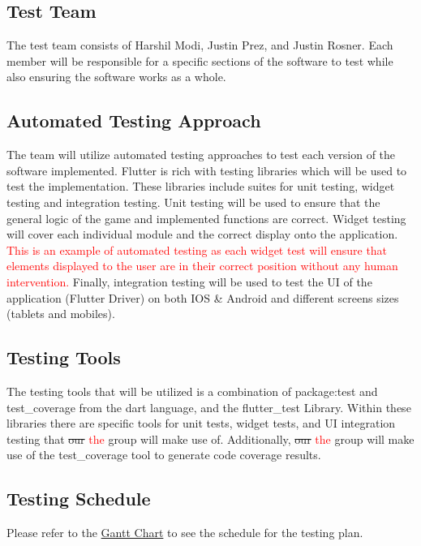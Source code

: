 \documentclass[12pt, titlepage]{article}
\begin{document}
\subsection{Test Team}
The test team consists of Harshil Modi, Justin Prez, and Justin Rosner. Each member will be responsible for a specific sections of the software to test while also ensuring the software works as a whole.

\subsection{Automated Testing Approach}
The team will utilize automated testing approaches to test each version of the software implemented. Flutter is rich with testing libraries which will be used to test the implementation. These libraries include suites for unit testing, widget testing and integration testing. Unit testing will be used to ensure that the general logic of the game and implemented functions are correct. Widget testing will cover each individual module and the correct display onto the application. \textcolor{red}{This is an example of automated testing as each widget test will ensure that elements displayed to the user are in their correct position without any human intervention.} Finally, integration testing will be used to test the UI of the application (Flutter Driver) on both IOS \& Android and different screens sizes (tablets and mobiles).

\subsection{Testing Tools}
The testing tools that will be utilized is a combination of package:test and test\_coverage from the dart language, and the flutter\_test Library. Within these libraries there are specific tools for unit tests, widget tests, and UI integration testing that \sout{our} \textcolor{red}{the} group will make use of. Additionally, \sout{our} \textcolor{red}{the} group will make use of the test\_coverage tool to generate code coverage results.

\subsection{Testing Schedule}
		
Please refer to the \href{https://gitlab.cas.mcmaster.ca/rosnej1/open-mastermind/-/blob/master/ProjectSchedule/ProjectSchedule.pdf}{Gantt Chart} to see the schedule for the testing plan.
\end{document}
